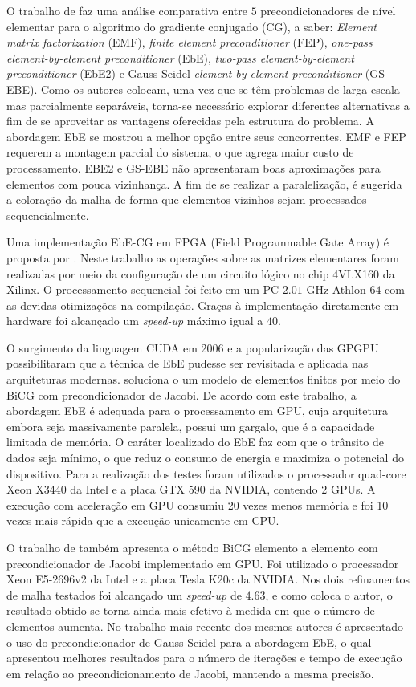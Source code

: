 \documentclass[
    12pt,               %
    openright,          %
    oneside,
    a4paper,            %
    english,            %
    french,             %
    spanish,            %
    brazil              %
    ]{abntex2}
\begin{document}
O trabalho de  faz uma análise comparativa entre $5$ precondicionadores de nível elementar para o algoritmo do gradiente conjugado (CG), a saber: \textit{Element matrix factorization} (EMF), \textit{finite element preconditioner} (FEP), \textit{one-pass element-by-element preconditioner} (EbE), \textit{two-pass element-by-element preconditioner} (EbE2) e Gauss-Seidel \textit{element-by-element preconditioner} (GS-EBE). Como os autores colocam, uma vez que se têm problemas de larga escala mas parcialmente separáveis, torna-se necessário explorar diferentes alternativas a fim de se aproveitar as vantagens oferecidas pela estrutura do problema. A abordagem EbE se mostrou a melhor opção entre seus concorrentes. EMF e FEP requerem a montagem parcial do sistema, o que agrega maior custo de processamento. EBE2 e GS-EBE não apresentaram boas aproximações para elementos com pouca vizinhança. A fim de se realizar a paralelização, é sugerida a coloração da malha de forma que elementos vizinhos sejam processados sequencialmente.

Uma implementação EbE-CG em FPGA (Field Programmable Gate Array) é proposta por . Neste trabalho as operações sobre as matrizes elementares foram realizadas por meio da configuração de um circuito lógico no chip 4VLX160 da Xilinx. O processamento sequencial foi feito em um PC $2.01$ GHz Athlon $64$ com as devidas otimizações na compilação. Graças à implementação diretamente em hardware foi alcançado um \textit{speed-up} máximo igual a $40$.

O surgimento da linguagem CUDA em 2006 e a popularização das GPGPU possibilitaram que a técnica de EbE pudesse ser revisitada e aplicada nas arquiteturas modernas.  soluciona o um modelo de elementos finitos por meio do BiCG com precondicionador de Jacobi.  De acordo com este trabalho, a abordagem EbE é adequada para o processamento em GPU, cuja arquitetura embora seja massivamente paralela, possui um gargalo, que é a  capacidade limitada de memória. O caráter localizado do EbE faz com que o trânsito de dados seja mínimo, o que reduz o consumo de energia e maximiza o potencial do dispositivo. Para a realização dos testes foram utilizados o processador quad-core Xeon X3440 da Intel e a placa GTX 590 da NVIDIA, contendo $2$ GPUs. A execução com aceleração em GPU consumiu 20 vezes menos memória e foi 10 vezes mais rápida que a execução unicamente em CPU.

O trabalho de  também apresenta o método BiCG elemento a elemento com precondicionador de Jacobi implementado em GPU. Foi utilizado o processador Xeon E5-2696v2 da Intel e a placa Tesla K20c da NVIDIA. Nos dois refinamentos de malha testados foi alcançado um \textit{speed-up} de $4.63$, e como coloca o autor, o resultado obtido se torna ainda mais efetivo à medida em que o número de elementos aumenta. No trabalho mais recente dos mesmos autores \cite{Yan2017} é apresentado o uso do precondicionador de Gauss-Seidel para a abordagem EbE, o qual apresentou melhores resultados para o número de iterações e tempo de execução em relação ao precondicionamento de Jacobi, mantendo a mesma precisão.
\end{document}
